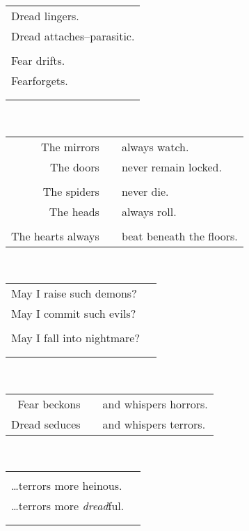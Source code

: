 \documentclass{article}
\begin{document}
\begin{center}
\begin{tabular}{l}
Dread lingers. \\
Dread attaches--parasitic. \\
\\
Fear drifts. \\
Fear\hspace*{10ex}forgets. \\
\\
\\
\end{tabular}\\
\begin{tabular}{rcl}
The mirrors & \hspace*{4ex} & always watch. \\
The doors && never remain locked. \\
&\\
The spiders && never die. \\
The heads && always roll. \\
&\\
The hearts always && beat beneath the floors. \\
\end{tabular}\\\newpage
\begin{tabular}{ll}
May I raise such demons? &\\
May I commit such evils? &\\
&\\
May I fall into nightmare?\hspace*{0.8em}&\\
&\\
&\\
\end{tabular}\\
\begin{tabular}{rcl}
Fear beckons & \hspace*{4ex} & and whispers horrors. \\
\hspace*{1em}Dread seduces && and whispers terrors. \\
\end{tabular}\\
\begin{tabular}{ll}
&\\
\ldots{}terrors more heinous. &\\
\ldots{}terrors more \textit{dread}ful. &\\
&\\
&\\

\end{tabular}
\end{center}
\end{document}
